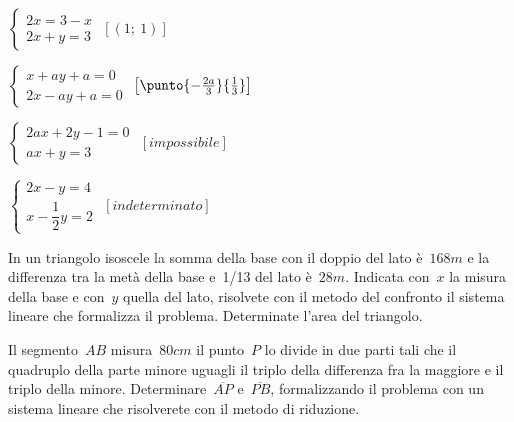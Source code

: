 \begin{esercizio}[\Ast]
\begin{multicols}{2}
\begin{enumeratea}
 \item \(\left\{\begin{array}{l}2x=3-x\\2x+y=3\end{array}\right.\)
 \hfill \(\left[(1;~1)\right]\)
 \item \(\left\{\begin{array}{l}x+ay+a=0\\2x-ay+a=0\end{array}\right.\)
 \hfill \(\left[\punto{-\frac{2a}{3}}{\-\frac{1}{3}}\right]\)
 \item \(\left\{\begin{array}{l}2ax+2y-1=0\\ax+y=3\end{array}\right.\)
 \hfill \(\left[impossibile\right]\)
 \item \(\left\{\begin{array}{l}2x-y=4\\x-\dfrac{1}{2}y=2\end{array}\right.\)
 \hfill \(\left[indeterminato\right]\)
\end{enumeratea}
 \end{multicols}
\end{esercizio}

\begin{esercizio}
 \label{ese:22.19}
In un triangolo isoscele la somma della base con il doppio del lato
è~\(168\unit{m}\) e la differenza tra la metà della base e~1/13 del lato 
è~\(28\unit{m}\).
Indicata con~\(x\) la misura della base e con~\(y\) quella del lato,
risolvete con il metodo del confronto il sistema lineare che formalizza
il problema. Determinate l'area del triangolo.
 \end{esercizio}

\begin{esercizio}
 \label{ese:22.23}
Il segmento~\(AB\) misura~\(80\unit{cm}\) il punto~\(P\) lo divide in due parti tali 
che il quadruplo della parte minore uguagli il triplo della differenza fra 
la maggiore e il triplo della minore. 
Determinare~\(\overline{AP}\) e~\(\overline{PB}\), formalizzando
il problema con un sistema lineare che risolverete con il metodo di
riduzione.
\begin{center}
%  
\end{center}
\end{esercizio}


